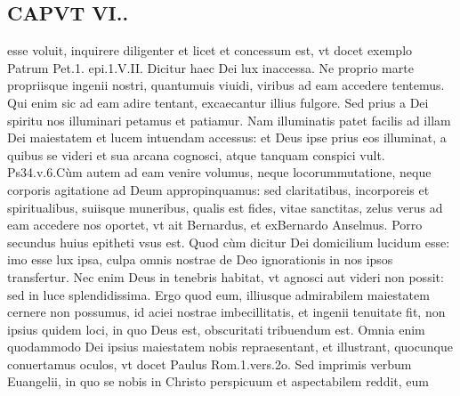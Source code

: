 \documentclass{article}
\begin{document}
\begin{pages}
\section*{CAPVT  VI.. }
\marginpar{[ p.489 ]}\pstart esse voluit, inquirere diligenter et licet et concessum est, vt docet exemplo Patrum Pet.1. epi.1.V.II. Dicitur haec Dei lux inaccessa. Ne proprio marte propriisque  ingenii nostri, quantumuis viuidi, viribus ad eam accedere tentemus. Qui enim sic ad eam adire tentant, excaecantur illius fulgore. Sed prius a Dei spiritu nos illuminari petamus et patiamur. Nam illuminatis patet facilis ad illam Dei maiestatem et lucem intuendam accessus: et Deus ipse prius eos illuminat, a quibus se videri et sua arcana cognosci, atque tanquam conspici vult. Ps34.v.6.Cùm autem ad eam venire volumus, neque  locorummutatione, neque corporis agitatione ad Deum appropinquamus: sed claritatibus, incorporeis et spiritualibus, suiisque muneribus, qualis est fides, vitae sanctitas, zelus verus ad eam accedere nos oportet, vt ait Bernardus, et exBernardo Anselmus.  \pend\pstart Porro secundus huius epitheti vsus est. Quod cùm dicitur Dei domicilium lucidum esse: imo esse lux ipsa, culpa omnis nostrae de Deo ignorationis in nos ipsos transfertur. Nec enim Deus in tenebris habitat, vt agnosci aut videri non possit: sed in luce splendidissima. Ergo quod eum, illiusque admirabilem maiestatem cernere non possumus, id aciei nostrae imbecillitatis, et ingenii tenuitate fit, non ipsius quidem loci, in quo Deus est, obscuritati tribuendum est. Omnia enim quodammodo Dei ipsius maiestatem nobis repraesentant, et illustrant, quocunque conuertamus oculos, vt docet Paulus Rom.1.vers.2o. Sed imprimis verbum Euangelii, in quo se nobis in Christo perspicuum et aspectabilem reddit, eum  \pend

\end{pages}
\end{document}
